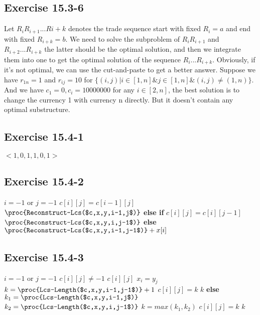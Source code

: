 \documentclass[12pt]{article}
\theoremstyle{definition}
\theoremstyle{remark}
\begin{document}
\subsection*{Exercise 15.3-6}
Let $R_iR_{i+1}...R{i+k}$ denotes the trade sequence start with fixed $R_i=a$ and end with fixed $R_{i+k}=b$. We need to solve the subproblem of $R_iR_{i+1}$ and $R_{i+2}...R_{i+k}$ the latter should be the optimal solution, and then we integrate them into one to get the optimal solution of the sequence $R_i...R_{i+k}$. Obviously, if it's not optimal, we can use the cut-and-paste to get a better answer. Suppose we have $r_{1n}=1$ and $r_{ij}=10$ for $\{(i,j)|i\in[1,n]\&j\in[1,n]\&(i,j)\ne (1,n)\}$. And we have $c_1=0,c_i=10000000$ for any $i\in[2,n]$, the best solution is to change the currency 1 with currency n directly. But it doesn't contain any optimal substructure.
\subsection*{Exercise 15.4-1}
$<1,0,1,1,0,1>$
\subsection*{Exercise 15.4-2}
\begin{codebox}
\li \If $i=-1$ or $j=-1$
\li \quad \Return
\li \If $c[i][j]=c[i-1][j]$ \label{li:if}
\li \quad \Return $\proc{Reconstruct-Lcs($c,x,y,i-1,j$)}$
\li \textbf{else if} $c[i][j]=c[i][j-1]$
\li \quad \Return $\proc{Reconstruct-Lcs($c,x,y,i,j-1$)}$
\li \textbf{else}
\li \quad \Return $\proc{Reconstruct-Lcs($c,x,y,i-1,j-1$)}+x[i]$
\end{codebox}
\subsection*{Exercise 15.4-3}
\begin{codebox}
\li \If $i=-1$ or $j=-1$ \label{li:if}
\li \quad {}
\li \If $c[i][j]\ne -1$ \label{li:if}
\li \quad \Return $c[i][j]$
\li \If $x_i=y_j$ \label{li:if}
\li \quad $k=\proc{Lcs-Length($c,x,y,i-1,j-1$)}+1$
\li \quad $c[i][j]=k$
\li \quad \Return $k$
\li \textbf{else}
\li \quad $k_1=\proc{Lcs-Length($c,x,y,i-1,j$)}$
\li \quad $k_2=\proc{Lcs-Length($c,x,y,i,j-1$)}$
\li \quad $k=max(k_1,k_2)$
\li \quad $c[i][j]=k$
\li \quad \Return $k$
\end{codebox}
\end{document}
